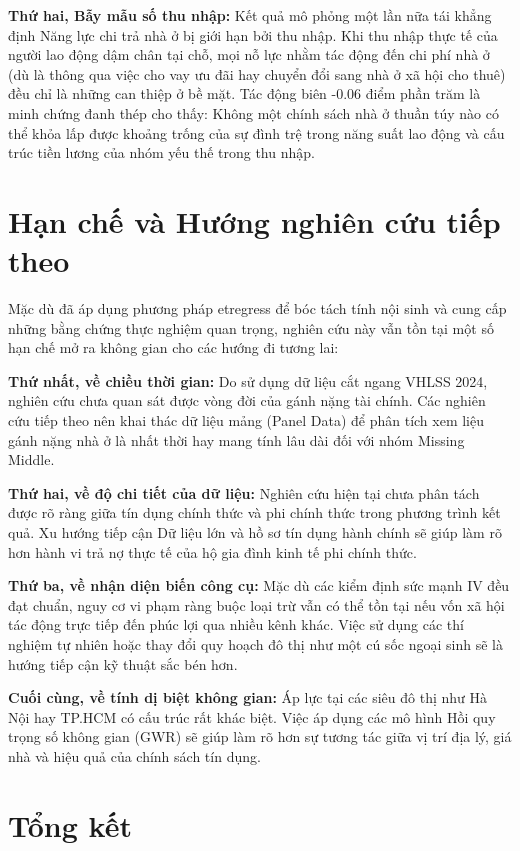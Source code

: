 \documentclass[12pt,a4paper]{report}
\begin{document}
\textbf{Thứ hai, Bẫy mẫu số thu nhập:} Kết quả mô phỏng một lần nữa tái khẳng định Năng lực chi trả nhà ở bị giới hạn bởi thu nhập. Khi thu nhập thực tế của người lao động dậm chân tại chỗ, mọi nỗ lực nhằm tác động đến chi phí nhà ở (dù là thông qua việc cho vay ưu đãi hay chuyển đổi sang nhà ở xã hội cho thuê) đều chỉ là những can thiệp ở bề mặt. Tác động biên -0.06 điểm phần trăm là minh chứng đanh thép cho thấy: Không một chính sách nhà ở thuần túy nào có thể khỏa lấp được khoảng trống của sự đình trệ trong năng suất lao động và cấu trúc tiền lương của nhóm yếu thế trong thu nhập.

\section{Hạn chế và Hướng nghiên cứu tiếp theo}

Mặc dù đã áp dụng phương pháp etregress để bóc tách tính nội sinh và cung cấp những bằng chứng thực nghiệm quan trọng, nghiên cứu này vẫn tồn tại một số hạn chế mở ra không gian cho các hướng đi tương lai:

\textbf{Thứ nhất, về chiều thời gian:} Do sử dụng dữ liệu cắt ngang VHLSS 2024, nghiên cứu chưa quan sát được vòng đời của gánh nặng tài chính. Các nghiên cứu tiếp theo nên khai thác dữ liệu mảng (Panel Data) để phân tích xem liệu gánh nặng nhà ở là nhất thời hay mang tính lâu dài đối với nhóm Missing Middle.

\textbf{Thứ hai, về độ chi tiết của dữ liệu:} Nghiên cứu hiện tại chưa phân tách được rõ ràng giữa tín dụng chính thức và phi chính thức trong phương trình kết quả. Xu hướng tiếp cận Dữ liệu lớn và hồ sơ tín dụng hành chính sẽ giúp làm rõ hơn hành vi trả nợ thực tế của hộ gia đình kinh tế phi chính thức.

\textbf{Thứ ba, về nhận diện biến công cụ:} Mặc dù các kiểm định sức mạnh IV đều đạt chuẩn, nguy cơ vi phạm ràng buộc loại trừ vẫn có thể tồn tại nếu vốn xã hội tác động trực tiếp đến phúc lợi qua nhiều kênh khác. Việc sử dụng các thí nghiệm tự nhiên hoặc thay đổi quy hoạch đô thị như một cú sốc ngoại sinh sẽ là hướng tiếp cận kỹ thuật sắc bén hơn.

\textbf{Cuối cùng, về tính dị biệt không gian:} Áp lực tại các siêu đô thị như Hà Nội hay TP.HCM có cấu trúc rất khác biệt. Việc áp dụng các mô hình Hồi quy trọng số không gian (GWR) sẽ giúp làm rõ hơn sự tương tác giữa vị trí địa lý, giá nhà và hiệu quả của chính sách tín dụng.

\section{Tổng kết}
\end{document}
